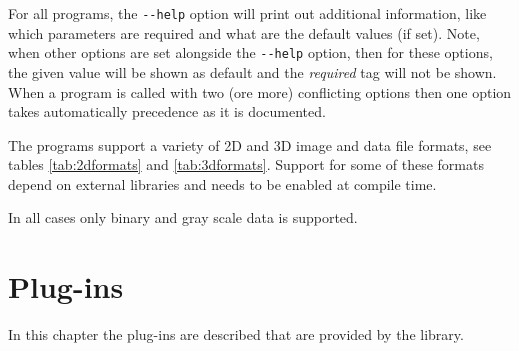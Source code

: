 \documentclass[english, 10pt, a4paper,headsepline,openany]{scrbook}
\begin{document}
For all programs, the \texttt{-{}-help} option will print out additional information, like which parameters 
  are required and what are the default values (if set).
Note, when other options are set alongside the \texttt{-{}-help} option, then for these options, the given value 
  will be shown as default and the \emph{required} tag will not be shown.
When a program is called with two (ore more) conflicting options then one option takes automatically precedence 
  as it is documented. 


The programs support a variety of 2D and 3D image and data file formats, see tables \ref{tab:2dformats} 
and \ref{tab:3dformats}. 
Support for some of these formats depend on external libraries and needs to be enabled at compile time.

\begin{table}[h]
\caption{\label{tab:2dformats}2D image formats}
\end{table}

\begin{table}[h]
\caption{\label{tab:3dformats}3D image formats}
\end{table}

\noindent 
In all cases only binary and gray scale data is supported.




\chapter{Plug-ins}
\label{ch:plugins}

In this chapter the plug-ins are described that are provided by the library.



\cleardoublepage{}

\end{document}
